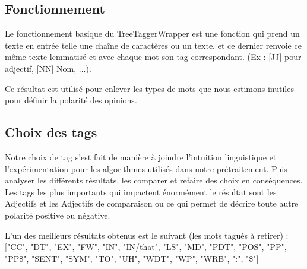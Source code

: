 \documentclass[a4paper]{report}
\begin{document}
            \subsection{Fonctionnement}

                Le fonctionnement basique du TreeTaggerWrapper est une fonction qui prend un texte en entrée telle une chaîne de caractères ou un texte, et ce dernier renvoie ce même texte lemmatisé et avec chaque mot son tag correspondant. (Ex : [JJ] pour adjectif, [NN] Nom, ...).

                Ce résultat est utilisé pour enlever les types de mots que nous estimons inutiles pour définir la polarité des opinions.

            \subsection{Choix des tags}

                Notre choix de tag s’est fait de manière à joindre l’intuition linguistique et l’expérimentation pour les algorithmes utilisés dans notre prétraitement. Puis analyser les différents résultats, les comparer et refaire des choix en conséquences.
                Les tags les plus importants qui impactent énormément le résultat sont les Adjectifs et les Adjectifs de comparaison ou ce qui permet de décrire toute autre polarité positive ou négative.

                L’un des meilleurs résultats obtenus est le suivant (les mots tagués à retirer) : ["CC", "DT", "EX", "FW", "IN", "IN/that", "LS", "MD", "PDT", "POS", "PP", "PP\$", "SENT", "SYM", "TO", "UH", "WDT", "WP", "WRB", ":", "\$"]
\end{document}
